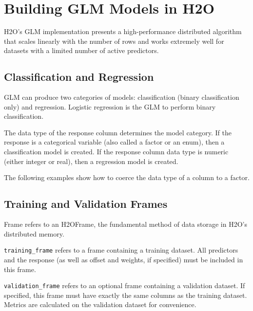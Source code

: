 \section{Building GLM Models in H2O}

H2O's GLM implementation presents a high-performance distributed algorithm that scales linearly with the number
of rows and works extremely well for datasets with a limited number of active predictors.

\subsection{Classification and Regression}

GLM can produce two categories of models: classification (binary classification only) and regression. Logistic regression is the GLM to perform binary classification.

The data type of the response column determines the model category.  If the response is a categorical variable
(also called a factor or an enum), then a classification model is created.  If the response column data type is
numeric (either integer or real), then a regression model is created. 

The following examples show how to coerce the data type of a column to a factor.

\waterExampleInR

\newpage
\waterExampleInPython


\subsection{Training and Validation Frames}

Frame refers to an H2OFrame, the fundamental method of data storage in H2O's distributed memory.

\texttt{training\_frame} refers to a frame containing a training dataset.  All predictors and the response (as
well as offset and weights, if specified) must be included in this frame.

\texttt{validation\_frame} refers to an optional frame containing a validation dataset.  If specified, this 
frame must have exactly the same columns as the training dataset.  Metrics are calculated on the validation dataset for convenience.


